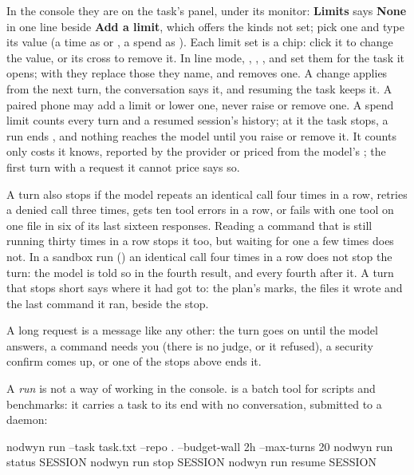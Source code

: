 In the console they are on the task's panel, under its monitor:
\textbf{Limits} says \textbf{None} in one line beside \textbf{Add a limit},
which offers the kinds not set; pick one and type its value (a time as
 or , a spend as ). Each limit set is a
chip: click it to change the value, or its cross to remove it. In line mode,
, , ,
 and  set them for the task it
opens; with  they replace those they name, and 
removes one. A change applies from the next turn, the conversation says it,
and resuming the task keeps it. A paired phone may add a limit or lower one,
never raise or remove one. A spend limit counts every turn and a resumed
session's history; at it the task stops, a run ends , and
nothing reaches the model until you raise or remove it. It counts only costs
it knows, reported by the provider or priced from the model's
; the first turn with a request it cannot price says so.

A turn also stops if the model
repeats an identical call four times in a row, retries a denied call three
times, gets ten tool errors in a row, or fails with one tool on one file in
six of its last sixteen responses. Reading a command that is still running
thirty times in a row stops it too, but waiting for one a few times does not.
In a sandbox run () an identical call
four times in a row does not stop the turn: the model is told so in the
fourth result, and every fourth after it.
A turn that stops short says where it had got to: the plan's marks, the files
it wrote and the last command it ran, beside the stop.

A long request is a message like any other: the turn goes on until the
model answers, a command needs you (there is no judge, or it refused), a
security confirm comes up, or one of the stops above ends it.

A \emph{run} is not a way of working in the console.  is a
batch tool for scripts and benchmarks: it carries a task to its end with no
conversation, submitted to a daemon:

\begin{sh}
nodwyn run --task task.txt --repo . --budget-wall 2h --max-turns 20
nodwyn run status SESSION
nodwyn run stop SESSION
nodwyn run resume SESSION
\end{sh}

